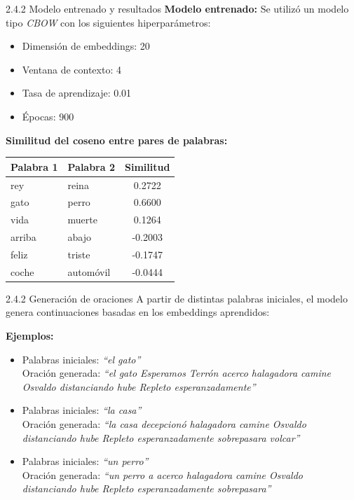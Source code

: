 \documentclass{beamer}
\begin{document}
\begin{frame}{2.4.2 Modelo entrenado y resultados}
	\justifying
	\textbf{Modelo entrenado:} Se utilizó un modelo tipo \textit{CBOW} con los siguientes hiperparámetros:
	\begin{itemize}
		\item Dimensión de embeddings: 20
		\item Ventana de contexto: 4
		\item Tasa de aprendizaje: 0.01
		\item Épocas: 900
	\end{itemize}
	
	\vspace{0.3cm}
	\textbf{Similitud del coseno entre pares de palabras:}
	\begin{table}[]
		\centering
		\begin{tabular}{l l c}
			\hline
			Palabra 1 & Palabra 2 & Similitud \\
			\hline
			rey     & reina     & 0.2722 \\
			gato    & perro     & 0.6600 \\
			vida    & muerte    & 0.1264 \\
			arriba  & abajo     & -0.2003 \\
			feliz   & triste    & -0.1747 \\
			coche   & automóvil & -0.0444 \\
			\hline
		\end{tabular}
	\end{table}
	
\end{frame}


\begin{frame}{2.4.2 Generación de oraciones}
	\justifying
	A partir de distintas palabras iniciales, el modelo genera continuaciones basadas en los embeddings aprendidos:
	
	\vspace{0.3cm}
	\textbf{Ejemplos:}
	\begin{itemize}
		\item Palabras iniciales: \textit{``el gato''} \\
		Oración generada: \textit{``el gato Esperamos Terrón acerco halagadora camine Osvaldo distanciando hube Repleto esperanzadamente''}
		\item Palabras iniciales: \textit{``la casa''} \\
		Oración generada: \textit{``la casa decepcionó halagadora camine Osvaldo distanciando hube Repleto esperanzadamente sobrepasara volcar''}
		\item Palabras iniciales: \textit{``un perro''} \\
		Oración generada: \textit{``un perro a acerco halagadora camine Osvaldo distanciando hube Repleto esperanzadamente sobrepasara''}
	\end{itemize}
\end{frame}
\end{document}
